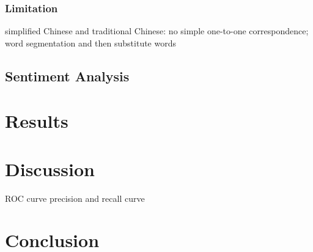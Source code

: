 \documentclass[11pt]{article}
\newcommand{\1}[1]{{\mathbf 1}\left\{#1\right\}}        %
\begin{document}
\subsubsection{Limitation}

simplified Chinese and traditional Chinese: no simple one-to-one correspondence; word segmentation and then substitute words

\subsection{Sentiment Analysis}



\section{Results}

\section{Discussion}

ROC curve
precision and recall curve

\section{Conclusion}



%


%
%




%
\end{document}
